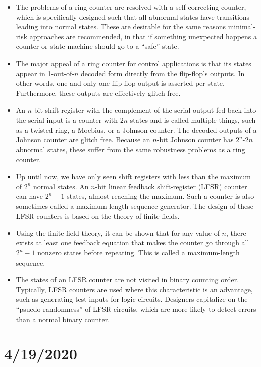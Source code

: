 \documentclass[10pt,a4paper]{article}
\begin{document}
\begin{itemize}
\item The problems of a ring counter are resolved with a self-correcting counter, which is specifically designed such that all abnormal states have transitions leading into normal states. These are desirable for the same reasons minimal-risk approaches are recommended, in that if something unexpected happens a counter or state machine should go to a ``safe'' state.
\item The major appeal of a ring counter for control applications is that its states appear in 1-out-of-$n$ decoded form directly from the flip-flop's outputs. In other words, one and only one flip-flop output is asserted per state. Furthermore, these outputs are effectively glitch-free.
\item An $n$-bit shift register with the complement of the serial output fed back into the serial input is a counter with $2n$ states and is called multiple things, such as a twisted-ring, a Moebius, or a Johnson counter. The decoded outputs of a Johnson counter are glitch free. Because an $n$-bit Johnson counter has $2^n$-$2n$ abnormal states, these suffer from the same robustness problems as a ring counter. 
\item Up until now, we have only seen shift registers with less than the maximum of $2^n$ normal states. An $n$-bit linear feedback shift-register  (LFSR) counter can have $2^n-1$ states, almost reaching the maximum. Such a counter is also sometimes called a maximum-length sequence generator. The design of these LFSR counters is based on the theory of finite fields. 
\item Using the finite-field theory, it can be shown that for any value of $n$, there exists at least one feedback equation that makes the counter go through all $2^n-1$ nonzero states before repeating. This is called a maximum-length sequence. 
\item The states of an LFSR counter are not visited in binary counting order. Typically, LFSR counters are used where this characteristic is an advantage, such as generating test inputs for logic circuits. Designers capitalize on the ``psuedo-randomness'' of LFSR circuits, which are more likely to detect errors than a normal binary counter. 
\end{itemize}
\pagebreak
\section{4/19/2020}
\end{document}
